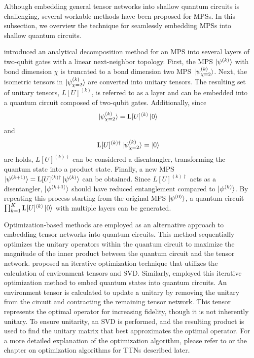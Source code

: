 \documentclass[12pt,dvipdfmx,twoside,openright]{report}
\begin{document}
Although embedding general tensor networks into shallow quantum circuits is challenging, several workable methods have been proposed for MPSs.
In this subsection, we overview the technique for seamlessly embedding MPSs into shallow quantum circuits.

\cite{EncodingMPS} introduced an analytical decomposition method for an MPS into several layers of two-qubit gates with a linear next-neighbor topology. 
First, the MPS $\ket{\psi^{(k)}}$ with bond dimension $\chi$ is truncated to a bond dimension two MPS $\ket{\psi_{\chi=2}^{(k)}}$.
Next, the isometric tensors in $\ket{\psi_{\chi=2}^{(k)}}$ are converted into unitary tensors.
The resulting set of unitary tensors, $L[U]^{(k)}$, is referred to as a layer and can be embedded into a quantum circuit composed of two-qubit gates.
Additionally, since
\begin{equation}
    \ket{\psi_{\chi=2}^{(k)}}=\mathrm{L}[U]^{(k)}\ket{0}
\end{equation}
and
\begin{equation}
    \mathrm{L}[U]^{(k)\dagger}\ket{\psi_{\chi=2}^{(k)}}=\ket{0}
\end{equation}
are holds, $L[U]^{(k)\dagger}$ can be considered a disentangler, transforming the quantum state into a product state.
Finally, a new MPS $\ket{\psi^{(k+1)}}=\mathrm{L}[U]^{(k)\dagger}\ket{\psi^{(k)}}$ can be obtained.
Since $L[U]^{(k)\dagger}$ acts as a disentangler, $\ket{\psi^{(k+1)}}$ should have reduced entanglement compared to $\ket{\psi^{(k)}}$.
By repeating this process starting from the original MPS $\ket{\psi^{(0)}}$, a quantum circuit $\prod_{k=1}^K \mathrm{L}[U]^{(k)}\ket{0}$ with multiple layers can be generated.
 
Optimization-based methods are employed as an alternative approach to embedding tensor networks into quantum circuits.
This method sequentially optimizes the unitary operators within the quantum circuit to maximize the magnitude of the inner product between the quantum circuit and the tensor network.
\cite{env-tensor} proposed an iterative optimization technique that utilizes the calculation of environment tensors and SVD.
Similarly, \cite{mpsoptim} employed this iterative optimization method to embed quantum states into quantum circuits.
An environment tensor is calculated to update a unitary by removing the unitary from the circuit and contracting the remaining tensor network.
This tensor represents the optimal operator for increasing fidelity, though it is not inherently unitary.
To ensure unitarity, an SVD is performed, and the resulting product is used to find the unitary matrix that best approximates the optimal operator.
For a more detailed explanation of the optimization algorithm, please refer to \cite{mpsdecomp} or the chapter on optimization algorithms for TTNs described later.
\end{document}
